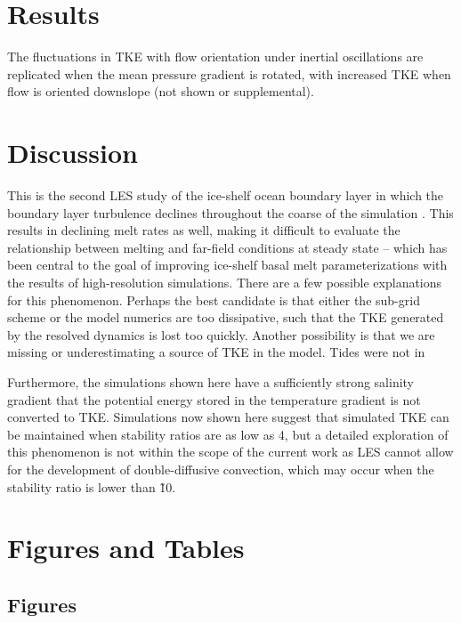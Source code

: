 \documentclass[draft]{styles/agujournal2019}
\begin{document}
\section{Results}


The fluctuations in TKE with flow orientation under inertial oscillations are replicated when the mean pressure gradient is rotated, with increased TKE when flow is oriented downslope (not shown or supplemental).


\section{Discussion}

This is the second LES study of the ice-shelf ocean boundary layer in which the boundary layer turbulence declines throughout the coarse of the simulation \cite{XX}. This results in declining melt rates as well, making it difficult to evaluate the relationship between melting and far-field conditions at steady state -- which has been central to the goal of improving ice-shelf basal melt parameterizations with the results of high-resolution simulations.
There are a few possible explanations for this phenomenon. Perhaps the best candidate is that either the sub-grid scheme or the model numerics are too dissipative, such that the TKE generated by the resolved dynamics is lost too quickly. Another possibility is that we are missing or underestimating a source of TKE in the model. Tides were not in

Furthermore, the simulations shown here have a sufficiently strong salinity gradient that the potential energy stored in the temperature gradient is not converted to TKE. Simulations now shown here suggest that simulated TKE can be maintained when stability ratios are as low as 4, but a detailed exploration of this phenomenon is not within the scope of the current work as LES cannot allow for the development of double-diffusive convection, which may occur when the stability ratio is lower than \~ 10.  

\section{Figures and Tables}

\subsection{Figures}
\end{document}
